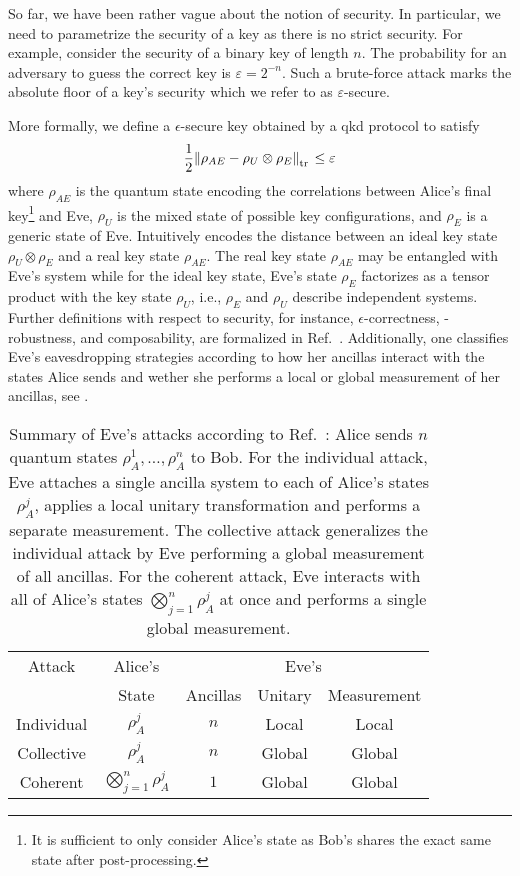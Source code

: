 So far, we have been rather vague about the notion of security.
In particular, we need to parametrize the security of a key as there is no strict security.
For example, consider the security of a binary key of length $n$.
The probability for an adversary to guess the correct key is $\varepsilon=2^{-n}$.
Such a brute-force attack marks the absolute floor of a key's security which we refer to as $\varepsilon$-secure.

More formally, we define a $\epsilon$-secure key obtained by a \gls{qkd} protocol to satisfy~\cite[p.~10]{Scarani2009}
\begin{equation}
	\frac{1}{2}
	\norm{\rho_{AE}-\rho_U\otimes\rho_E}_{\trace{}}
	\leq
	\varepsilon
	\label{eq:qkd_security}
\end{equation}
where $\rho_{AE}$ is the quantum state encoding the correlations between Alice's final key\footnote{It is sufficient to only consider Alice's state as Bob's shares the exact same state after post-processing.} and Eve, $\rho_U$ is the mixed state of possible key configurations, and $\rho_E$ is a generic state of Eve.
Intuitively  encodes the distance between an ideal key state $\rho_U\otimes\rho_E$ and a real key state $\rho_{AE}$.
The real key state $\rho_{AE}$ may be entangled with Eve's system while for the ideal key state, Eve's state $\rho_E$ factorizes as a tensor product with the key state $\rho_U$, i.e., $\rho_E$ and $\rho_U$ describe independent systems.
Further definitions with respect to security, for instance, $\epsilon$-correctness, -robustness, and composability, are formalized in Ref.~\cite[p.~119]{Wolf2021}.
Additionally, one classifies Eve's eavesdropping strategies according to how her ancillas interact with the states Alice sends and wether she performs a local or global measurement of her ancillas, see .
\begin{table}[htb]
	\centering
	\begin{tabular}{ccccc}
		\toprule
			Attack & Alice's & \multicolumn{3}{c}{Eve's} \\
			\cmidrule{3-5}
			& State & Ancillas & Unitary & Measurement \\
		\midrule
			Individual & $\rho_A^j$ & $n$ & Local & Local \\
			Collective & $\rho_A^j$ & $n$ & Global & Global \\
			Coherent & $\bigotimes_{j=1}^n\rho_A^j$ & $1$ & Global & Global \\
		\bottomrule
	\end{tabular}
	\caption{Summary of Eve's attacks according to Ref.~\cite[p.~128]{Wolf2021}: Alice sends $n$ quantum states $\rho_A^1,\dots,\rho_A^n$ to Bob. For the individual attack, Eve attaches a single ancilla system to each of Alice's states $\rho_A^j$, applies a local unitary transformation and performs a separate measurement. The collective attack generalizes the individual attack by Eve performing a global measurement of all ancillas. For the coherent attack, Eve interacts with all of Alice's states $\bigotimes_{j=1}^n\rho_A^j$ at once and performs a single global measurement.}\label{tab:eavesdropping_strategies}
\end{table}
